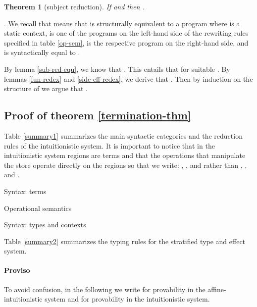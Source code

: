 \documentclass[11pt]{article}
\newtheorem{theorem}{Theorem}
\newcommand{\Proof}{\noindent {\sc Proof}. }
\newcommand{\qed}{\hfill}
\begin{document}
\begin{theorem}[subject reduction]
  If  and   then 
  .
\end{theorem}
\Proof
We recall that  means that 
 is structurally equivalent to a program
 where  is a static context,  
is one of the programs on the left-hand side of the
rewriting rules specified in table \ref{op-sem},
 is the respective program on the right-hand side,
and  is syntactically equal to .

By lemma \ref{sub-red-equ}, we know that 
.
This entails that  for
suitable .
By lemmas \ref{fun-redex} and \ref{side-eff-redex}, we derive that
.
Then by induction on the structure of  we argue 
that . \qed



\subsection{Proof of theorem \ref{termination-thm}}
Table \ref{summary1} summarizes the main syntactic categories and
the reduction rules of the intuitionistic system. 
It is important to notice that in the intuitionistic system
regions are terms and that the operations that manipulate the store
operate directly on the regions so that we write:
, , and  rather than
, , and . 

\begin{table}
{\footnotesize
\begin{center}
{\sc Syntax: terms}
\end{center}

\begin{center}
{\sc Operational semantics}
\end{center}


\begin{center}
{\sc Syntax: types and contexts}
\end{center}
}
\caption{Intuitionistic system: syntactic categories and operational semantics}\label{summary1}
\end{table}


Table \ref{summary2} summarizes the typing rules for the 
stratified type and effect system.

\paragraph{Proviso}
To avoid confusion, in the following we write  for provability 
in the affine-intuitionistic system and  for provability
in the intuitionistic system. \\
\end{document}
